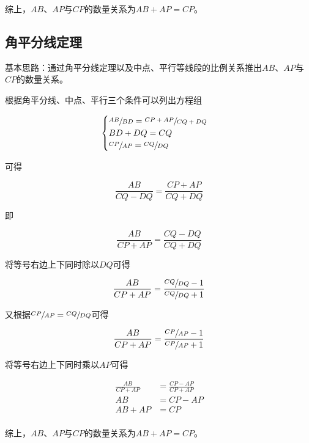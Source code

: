 综上，$AB$、$AP$与$CP$的数量关系为$AB + AP = CP$。

\subsection{角平分线定理}

基本思路：通过角平分线定理以及中点、平行等线段的比例关系推出$AB$、$AP$与$CP$的数量关系。

根据角平分线、中点、平行三个条件可以列出方程组

\[ \begin{cases}
  \sfrac{AB}{BD} = \sfrac{CP + AP}{CQ + DQ} \\
  BD + DQ = CQ \\
  \sfrac{CP}{AP} = \sfrac{CQ}{DQ} \\
\end{cases} \]

可得

\[ \frac{AB}{CQ - DQ} = \frac{CP + AP}{CQ + DQ} \]

即

\[ \frac{AB}{CP + AP} = \frac{CQ - DQ}{CQ + DQ} \]

将等号右边上下同时除以$DQ$可得

\[ \frac{AB}{CP + AP} = \frac{\sfrac{CQ}{DQ} - 1}{\sfrac{CQ}{DQ} + 1} \]

又根据$\sfrac{CP}{AP} = \sfrac{CQ}{DQ}$可得

\[ \frac{AB}{CP + AP} = \frac{\sfrac{CP}{AP} - 1}{\sfrac{CP}{AP} + 1} \]

将等号右边上下同时乘以$AP$可得

\begin{align*}
  \frac{AB}{CP + AP} &= \frac{CP - AP}{CP + AP} \\
  AB &= CP - AP \\
  AB + AP &= CP \\
\end{align*}

综上，$AB$、$AP$与$CP$的数量关系为$AB + AP = CP$。
